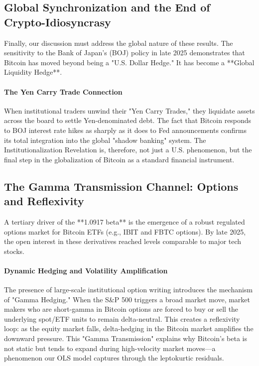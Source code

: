 \documentclass[10pt, conference, compsocconf]{IEEEtran}
\begin{document}

\subsection{Global Synchronization and the End of Crypto-Idiosyncrasy}

Finally, our discussion must address the global nature of these results. The sensitivity to the Bank of Japan’s (BOJ) policy in late 2025 demonstrates that Bitcoin has moved beyond being a "U.S. Dollar Hedge." It has become a **Global Liquidity Hedge**.

\paragraph{The Yen Carry Trade Connection}
When institutional traders unwind their "Yen Carry Trades," they liquidate assets across the board to settle Yen-denominated debt. The fact that Bitcoin responds to BOJ interest rate hikes as sharply as it does to Fed announcements confirms its total integration into the global "shadow banking" system. The Institutionalization Revelation is, therefore, not just a U.S. phenomenon, but the final step in the globalization of Bitcoin as a standard financial instrument.


\subsection{The Gamma Transmission Channel: Options and Reflexivity}

A tertiary driver of the **1.0917 beta** is the emergence of a robust regulated options market for Bitcoin ETFs (e.g., IBIT and FBTC options). By late 2025, the open interest in these derivatives reached levels comparable to major tech stocks.

\paragraph{Dynamic Hedging and Volatility Amplification}
The presence of large-scale institutional option writing introduces the mechanism of "Gamma Hedging." When the S\&P 500 triggers a broad market move, market makers who are short-gamma in Bitcoin options are forced to buy or sell the underlying spot/ETF units to remain delta-neutral. This creates a reflexivity loop: as the equity market falls, delta-hedging in the Bitcoin market amplifies the downward pressure. This "Gamma Transmission" explains why Bitcoin's beta is not static but tends to expand during high-velocity market moves—a phenomenon our OLS model captures through the leptokurtic residuals.
\end{document}
